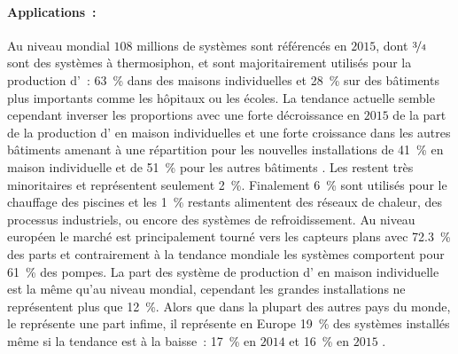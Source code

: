 \paragraph{Applications~:} %
\label{par:applications}
Au niveau mondial $108$ millions de systèmes sont référencés en $2015$, dont $\nicefrac{3}{4}$
sont des systèmes à thermosiphon, et sont majoritairement utilisés pour la production
d’~: \SI{63}{\percent} dans des maisons individuelles et \SI{28}{\percent} sur des bâtiments plus importants comme
les hôpitaux ou les écoles. La tendance actuelle semble cependant inverser les proportions
avec une forte décroissance en $2015$ de la part de la production d’ en maison individuelles
et une forte croissance dans les autres bâtiments amenant à une répartition pour les nouvelles installations
de \SI{41}{\percent} en maison individuelle et de \SI{51}{\percent} pour les autres bâtiments .
Les  restent très minoritaires et représentent seulement \SI{2}{\percent}.
Finalement \SI{6}{\percent} sont utilisés pour le chauffage des piscines et les \SI{1}{\percent}
restants alimentent des réseaux de chaleur, des processus industriels, ou encore des systèmes de
refroidissement.
Au niveau européen le marché est principalement tourné vers les capteurs plans avec \SI{72.3}{\percent}
des parts et contrairement à la tendance mondiale les systèmes comportent pour \SI{61}{\percent} des pompes.
La part des système de production d’ en maison individuelle est la même qu’au niveau mondial,
cependant les grandes installations ne représentent plus que \SI{12}{\percent}. Alors que
dans la plupart des autres pays du monde, le  représente une part infime, il
représente en Europe \SI{19}{\percent} des systèmes installés même si la tendance est à
la baisse~: \SI{17}{\percent} en $2014$ \parencite{Mauthner2016} et \SI{16}{\percent} en
$2015$ \parencite{Weiss2017}.


